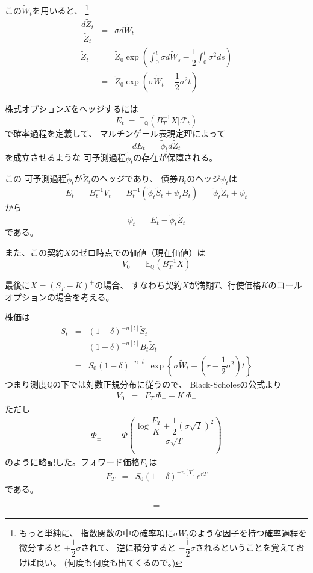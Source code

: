 \documentclass[uplatex,a4j,12pt,dvipdfmx]{jsarticle}
\begin{document}
この$\tilde{W}_{t}$を用いると、
%
\footnote{もっと単純に、
	指数関数の中の確率項に$\sigma W_{t}$のような因子を持つ確率過程を微分すると
	$+\dfrac{1}{2}\sigma$されて、
	逆に積分すると
	$-\dfrac{1}{2}\sigma$されるということを覚えておけば良い。
	(何度も何度も出てくるので。)
}
%
%
\begin{eqnarray*}
	\dfrac{d \tilde{Z}_{t}}{\tilde{Z}_{t}}
	&=&
	\sigma d \tilde{W}_{t}
	\\
	\tilde{Z}_{t}
	&=&
	\tilde{Z}_{0}
	\exp \left(
	\int^{t}_{0} \sigma d\tilde{W}_{s}
	-
	\dfrac{1}{2}
	\int^{t}_{0} \sigma^{2} ds
	\right)
	\\ &=&
	\tilde{Z}_{0}
	\exp \left(
	\sigma \tilde{W}_{t}
	-
	\dfrac{1}{2}
	\sigma^{2} t
	\right)
\end{eqnarray*}
%
%

株式オプション$X$をヘッジするには
$$
	E_{t}
	\ = \
	\mathbb{E}_{\mathbb{Q}}(B^{-1}_{T} X | \mathcal{F}_{t} )
$$
で確率過程を定義して、
マルチンゲール表現定理によって
$$
	dE_{t}
	\ = \
	\tilde{\phi}_{t}
	d \tilde{Z}_{t}
$$
を成立させるような
可予測過程$\tilde{\phi}_{t}$の存在が保障される。

この
可予測過程$\tilde{\phi}_{t}$が$\tilde{Z}_{t}$のヘッジであり、
債券$B_{t}$のヘッジ$\psi_{t}$は
$$
	E_{t}
	\ = \
	B^{-1}_{t} V_{t}
	\ = \
	B^{-1}_{t} ( \tilde{\phi}_{t} \tilde{S}_{t} + \psi_{t} B_{t} )
	\ = \
	\tilde{\phi}_{t} \tilde{Z}_{t} + \psi_{t}
$$
から
$$
	\psi_{t}
	\ = \
	E_{t} - \tilde{\phi}_{t} \tilde{Z}_{t}
$$
である。

また、この契約$X$のゼロ時点での価値（現在価値）は
$$
	V_{0}
	\ = \
	\mathbb{E}_{\mathbb{Q}}(B^{-1}_{T} X )
$$

最後に$X=(S_{T}-K)^{+}$の場合、
すなわち契約$X$が満期$T$、行使価格$K$のコールオプションの場合を考える。

株価は
%
%
\begin{eqnarray*}
	S_{t}
	&=&
	(1-\delta)^{-n[t]}
	\tilde{S}_{t}
	\\ &=&
	(1-\delta)^{-n[t]}
	B_{t}
	\tilde{Z}_{t}
	\\ &=&
	S_{0}
	(1-\delta)^{-n[t]}
	\exp
	\left\{
	\sigma \tilde{W}_{t}
	+
	\left(
	r
	-
	\dfrac{1}{2}
	\sigma^{2}
	\right)
	t
	\right\}
\end{eqnarray*}
%
%
つまり測度$\mathbb{Q}$の下では対数正規分布に従うので、
Black-Scholesの公式より
%
%
\begin{eqnarray*}
	V_{0}
	&=&
	F_{T}
	\ \! \Phi_{+}
	-
	K
	\ \! \Phi_{-}
\end{eqnarray*}
%
%
ただし
%
%
\begin{eqnarray*}
	\Phi_{\pm}
	&=&
	\Phi
	\left(
	\dfrac{
		\log \dfrac{F_{T}}{K} \pm \dfrac{1}{2} ( \sigma \sqrt{T} )^{2}
	}
	{\sigma \sqrt{T}}
	\right)
\end{eqnarray*}
%
%
のように略記した。フォワード価格$F_{T}$は
%
%
\begin{eqnarray*}
	F_{T}
	&=&
	S_{0}
	(1-\delta)^{-n[T]} e^{rT}
\end{eqnarray*}
%
%
である。

	\begin{eqnarray*}
		&=&
	\end{eqnarray*}
\fi
\end{document}
